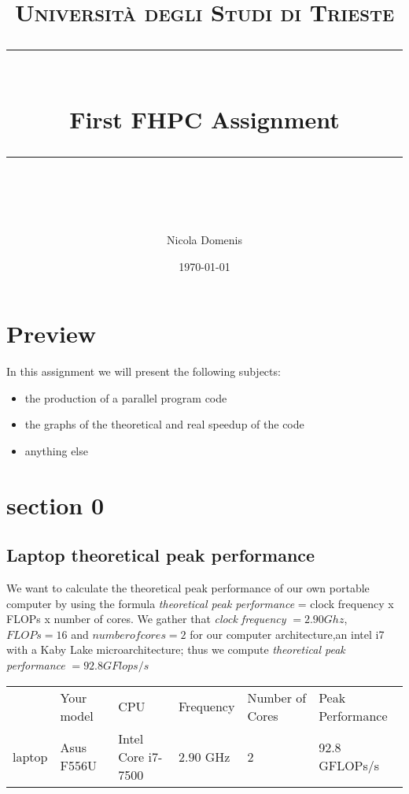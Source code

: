 \documentclass[11pt]{scrartcl} %
\title{	
	\normalfont\normalsize
	\textsc{Università degli Studi di Trieste}\\ %
	\vspace{25pt} %
	\rule{\linewidth}{0.5pt}\\ %
	\vspace{20pt} %
	{\huge First FHPC Assignment}\\ %
	\vspace{12pt} %
	\rule{\linewidth}{2pt}\\ %
	\vspace{12pt} %
}
\author{\LARGE Nicola Domenis} %
\date{\normalsize\today} %
\begin{document}
\maketitle %


\section{Preview}
 
In this assignment we will present the following subjects:

\begin{itemize}
	\item the production of a parallel program code
	\item the graphs of the theoretical and real speedup of the code
	\item anything else
\end{itemize}


\section{section 0}
\subsection{Laptop theoretical peak performance}

We want to calculate the theoretical peak performance of our own portable computer by using the formula \textit{theoretical peak performance} = clock frequency x FLOPs x number of cores.
We gather that \textit{clock frequency} $= 2.90 Ghz$,$ FLOPs = 16$ and $numberofcores = 2$ for our computer architecture,an intel i7 with a Kaby Lake microarchitecture; thus we compute \textit{theoretical peak performance} $= 92.8 GFlops/s$
%


\begin{table}[H]
		\begin{tabular}[H]{l| l| l| l| l| l }
			&Your model&CPU&Frequency&Number of Cores&Peak Performance\\
			laptop& Asus F556U & Intel Core i7-7500 &$2.90$ GHz&2&92.8 GFLOPs/s
		\end{tabular}
	\label{Result}
\end{table}
\end{document}
